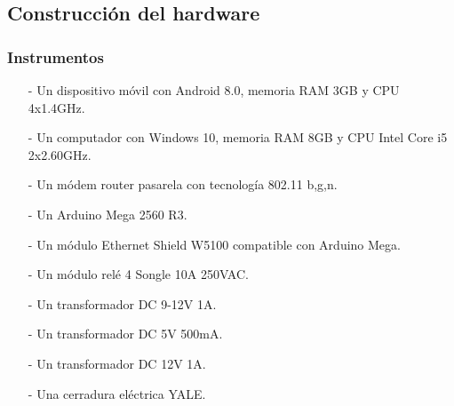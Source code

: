 \newpage
\subsection{Construcción del hardware}
\subsubsection{Instrumentos}
\begin{enumerate}
\item[-]Un dispositivo móvil con Android 8.0, memoria RAM 3GB y CPU 4x1.4GHz.
\item[-]Un computador con Windows 10, memoria RAM 8GB y CPU Intel Core i5 2x2.60GHz.
\item[-]Un módem router pasarela con tecnología 802.11 b,g,n.
\item[-]Un Arduino Mega 2560 R3.
\item[-]Un módulo Ethernet Shield W5100 compatible con Arduino Mega.
\item[-]Un módulo relé 4 Songle 10A 250VAC.
\item[-]Un transformador DC 9-12V 1A.
\item[-]Un transformador DC 5V 500mA.
\item[-]Un transformador DC 12V 1A.
\item[-]Una cerradura eléctrica YALE.
\end{enumerate}
